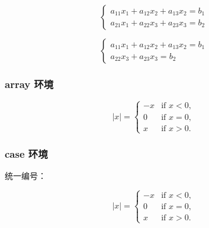 \documentclass[utf-8,a4paper,11pt]{article}
\begin{document}
\begin{LTXexample}
  \begin{equation}
    \left\{
      \begin{gathered}
          a_{11} x_{1} + a_{12} x_{2} + a_{13} x_{2} = b_{1}
          \\[3pt]
          a_{21} x_{1} + a_{22} x_{3} + a_{23} x_{3} = b_{2}
      \end{gathered}
    \right.
  \end{equation}
  
  \begin{equation*}
      \left\{
        \begin{aligned}
            a_{11} x_{1} + a_{12} x_{2} + a_{13} x_{2} = b_{1}
            \\[3pt]
            a_{22} x_{3} + a_{23} x_{3} = b_{2}
        \end{aligned}
      \right.
   \end{equation*}
\end{LTXexample}

\subsubsection{array 环境}

\begin{LTXexample}
\[
  |x| = \left\{
    \begin{array}{rl}
      -x & \mbox{if } x < 0,\\ 
      0 & \mbox{if } x = 0,\\ 
      x & \mbox{if } x > 0. 
    \end{array} \right.
\]
\end{LTXexample}

\subsubsection{case 环境}

统一编号：
\begin{LTXexample}
  \begin{equation} |x| =
    \begin{cases}
        -x & \mbox{if } x < 0,\\
        0 & \mbox{if } x = 0,\\
        x & \mbox{if } x > 0.
    \end{cases}
  \end{equation}
\end{LTXexample}
\end{document}
